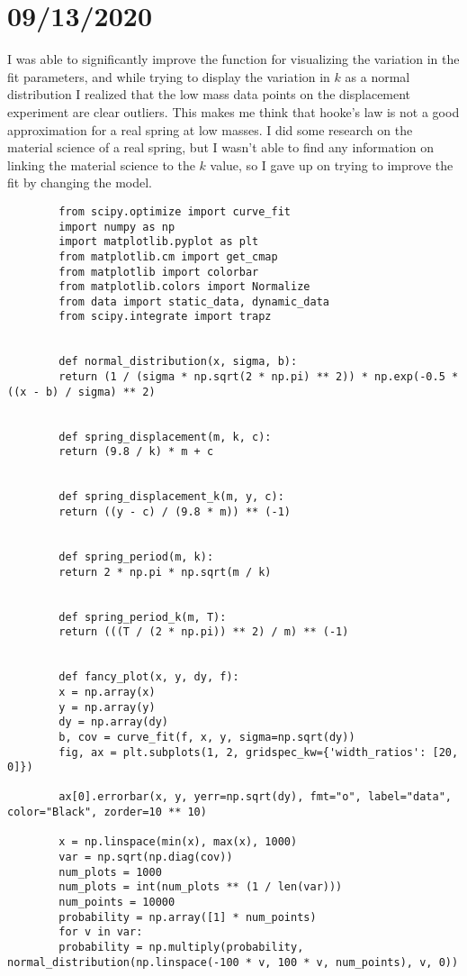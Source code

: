 \documentclass{article}
\begin{document}
    \section*{09/13/2020}
    I was able to significantly improve the function for visualizing the variation in the fit parameters, and while trying to display the variation in $k$ as a normal distribution I realized that the low mass data points on the displacement experiment are clear outliers. This makes me think that hooke's law is not a good approximation for a real spring at low masses. I did some research on the material science of a real spring, but I wasn't able to find any information on linking the material science to the $k$ value, so I gave up on trying to improve the fit by changing the model.
    \begin{verbatim}
        from scipy.optimize import curve_fit
        import numpy as np
        import matplotlib.pyplot as plt
        from matplotlib.cm import get_cmap
        from matplotlib import colorbar
        from matplotlib.colors import Normalize
        from data import static_data, dynamic_data
        from scipy.integrate import trapz


        def normal_distribution(x, sigma, b):
        return (1 / (sigma * np.sqrt(2 * np.pi) ** 2)) * np.exp(-0.5 * ((x - b) / sigma) ** 2)


        def spring_displacement(m, k, c):
        return (9.8 / k) * m + c


        def spring_displacement_k(m, y, c):
        return ((y - c) / (9.8 * m)) ** (-1)


        def spring_period(m, k):
        return 2 * np.pi * np.sqrt(m / k)


        def spring_period_k(m, T):
        return (((T / (2 * np.pi)) ** 2) / m) ** (-1)


        def fancy_plot(x, y, dy, f):
        x = np.array(x)
        y = np.array(y)
        dy = np.array(dy)
        b, cov = curve_fit(f, x, y, sigma=np.sqrt(dy))
        fig, ax = plt.subplots(1, 2, gridspec_kw={'width_ratios': [20, 0]})

        ax[0].errorbar(x, y, yerr=np.sqrt(dy), fmt="o", label="data", color="Black", zorder=10 ** 10)

        x = np.linspace(min(x), max(x), 1000)
        var = np.sqrt(np.diag(cov))
        num_plots = 1000
        num_plots = int(num_plots ** (1 / len(var)))
        num_points = 10000
        probability = np.array([1] * num_points)
        for v in var:
        probability = np.multiply(probability, normal_distribution(np.linspace(-100 * v, 100 * v, num_points), v, 0))


\end{verbatim}
\end{document}
